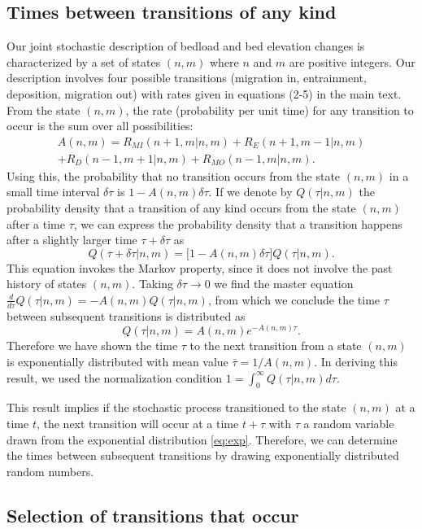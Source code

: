 \documentclass[11pt]{article}
\newcommand\be{\begin{equation}} %
\newcommand\ee{\end{equation}}   %
\begin{document}
\subsection{Times between transitions of any kind}
Our joint stochastic description of bedload and bed elevation changes is characterized by a set of states $(n,m)$ where $n$ and $m$ are positive integers. 
Our description involves four possible transitions (migration in, entrainment, deposition, migration out) with rates given in equations (2-5) in the main text.
From the state $(n,m)$, the rate (probability per unit time) for any transition to occur is the sum over all possibilities:
\begin{multline} A(n,m) = R_{MI}(n+1,m|n,m) + R_E(n+1,m-1|n,m) \\+ R_D(n-1,m+1|n,m) + R_{MO}(n-1,m|n,m).\end{multline}
Using this, the probability that no transition occurs from the state $(n,m)$ in a small time interval $\delta \tau$ is $1-A(n,m)\delta \tau$. If we denote by $Q(\tau|n,m)$ the probability density that a transition of any kind occurs from the state $(n,m)$ after a time $\tau$, we can express the probability density that a transition happens after a slightly larger time $\tau + \delta \tau$ as 
\be Q(\tau+\delta \tau|n,m) = \big[1-A(n,m)\delta \tau\big]Q(\tau|n,m).\ee
This equation invokes the Markov property, since it does not involve the past history of states $(n,m)$. Taking $\delta\tau \rightarrow 0 $ we find the master equation $\frac{d}{d\tau}Q(\tau|n,m) = -A(n,m)Q(\tau|n,m)$, from which we conclude the time $\tau$ between subsequent transitions is distributed as 
\be Q(\tau|n,m) = A(n,m)e^{-A(n,m)\tau}. \label{eq:exp}\ee
Therefore we have shown the time $\tau$ to the next transition from a state $(n,m)$ is exponentially distributed with mean value $\bar{\tau} = 1/A(n,m).$ In deriving this result, we used the normalization condition $1 = \int_0^\infty Q(\tau|n,m)d\tau.$

This result implies if the stochastic process transitioned to the state $(n,m)$ at a time $t$, the next transition will occur at a time $t+\tau$ with $\tau$ a random variable drawn from the exponential distribution \ref{eq:exp}.
Therefore, we can determine the times between subsequent transitions by drawing exponentially distributed random numbers.

\subsection{Selection of transitions that occur}
\end{document}
